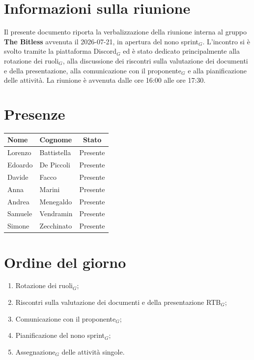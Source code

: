 \documentclass[a4paper, 10pt, colorlinks=true, linkcolor=black, urlcolor=blue, citecolor=blue, hidelinks]{article}
\begin{document}
\newcommand{\titolo}{Verbale interno}
\newcommand{\dataverbale}{2026-07-21}
\newcommand{\dataversione}{2026-07-21}
\newcommand{\versione}{1.0.0}
\newcommand{\stato}{Approvato}
\newcommand{\destinatari}{The Bitless, prof. Tullio Vardanega, prof. Riccardo Cardin}
\def\templatedir{../../../../templates}

\begin{titlepage}

\end{titlepage}

\newpage
\tableofcontents

\newpage
{}
\section{Informazioni sulla riunione}
Il presente documento riporta la verbalizzazione della riunione interna al gruppo \textbf{The Bitless} avvenuta il \dataverbale{}, in apertura del nono sprint$_G$. L'incontro si è svolto tramite la piattaforma Discord$_G$ ed è stato dedicato principalmente alla rotazione dei ruoli$_G$, alla discussione dei riscontri sulla valutazione dei documenti e della presentazione, alla comunicazione con il proponente$_G$ e alla pianificazione delle attività. La riunione è avvenuta dalle ore 16:00 alle ore 17:30. \\

\section{Presenze}
\begin{center}
\begin{tabular}{|l|l|c|}
\hline
\textbf{Nome} & \textbf{Cognome} & \textbf{Stato} \\
\hline
Lorenzo & Battistella & Presente \\
Edoardo & De Piccoli & Presente \\
Davide & Facco & Presente \\
Anna & Marini & Presente \\
Andrea & Menegaldo & Presente \\
Samuele & Vendramin & Presente \\
Simone & Zecchinato & Presente \\
\hline
\end{tabular}
\end{center}

\section{Ordine del giorno}
\begin{enumerate}
    \item Rotazione dei ruoli$_G$;
    \item Riscontri sulla valutazione dei documenti e della presentazione RTB$_G$;
    \item Comunicazione con il proponente$_G$;
    \item Pianificazione del nono sprint$_G$;
    \item Assegnazione$_G$ delle attività singole.
\end{enumerate}
\end{document}
